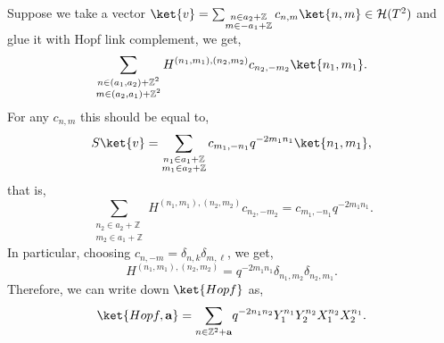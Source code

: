 \documentclass{article}
\newcommand{\Z}{{\mathbb Z}}
\def\be{\begin{equation}}
\def\ee{\end{equation}}
\numberwithin{corollary}{theorem}
\numberwithin{corollary}{proposition}
\begin{document}
Suppose we take a vector $\ket{v} = \sum_{ \substack{n \in a_{2} + \Z \\ m \in - a_{1} + \Z} } c_{n,m} \ket{n,m}  \in \mathcal{H}(T^{2})$ and glue it with Hopf link complement, we get, 
$$ \sum_{\substack{n \in (a_{1}, a_{2}) + \Z^{2} \\ m \in  (a_{2}, a_{1}) + \Z^{2} }} H^{(n_1,m_1),(n_2,m_2)} c_{n_{2}, -m_{2}} \ket{n_{1},m_{1}}. $$
For any $c_{n,m}$ this should be equal to, 
$$ S \ket{v} = \sum_{ \substack{n_{1} \in a_{1} + \Z \\ m_{1} \in a_{2} + \Z }} c_{m_{1},-n_{1}} q^{-2 m_{1} n_{1}} \ket{n_{1},m_{1}},$$
that is,
$$\sum_{\substack{n_{2} \in a_{2}+ \Z \\ m_{2} \in a_{1} + \Z }}  H^{(n_1,m_1),(n_2,m_2)} c_{n_{2}, -m_{2}} =  c_{m_{1},-n_{1}} q^{-2 m_{1} n_{1}}  . $$
In particular, choosing $c_{n,-m} = \delta_{n,k} \delta_{m,\ell}$, we get, 
\be 
H^{(n_1,m_1),(n_2,m_2)} = q^{- 2 m_{1} n_{1}}  \delta_{ n_{1}, m_{2} } \delta_{n_{2}, m_{1}}.
\ee 
Therefore, we can write down $\ket{Hopf}$ as,
$$\ket{Hopf,\mathbf{a}} = {\sum_{n\in \Z^2+\mathbf{a}}} q^{-2n_1 n_2} Y_1^{n_1}Y_2^{n_2} X_1^{n_2} X_2^{n_1} .$$
\end{document}
